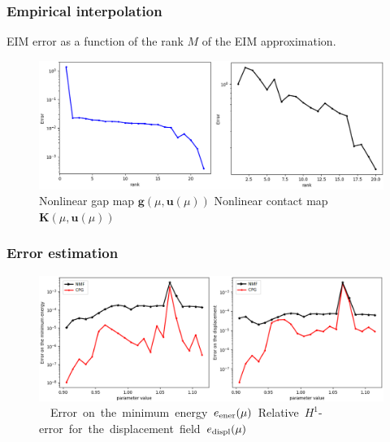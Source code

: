 \begin{frame}\frametitle{Empirical interpolation}
	EIM error as a function of the rank $M$ of the EIM approximation.
	\medskip
	
	\begin{figure}[ht!]
		\includegraphics[width=\textwidth]{./images/contact/eims.png}
		\centering 
		\tiny{Nonlinear gap map $\mathbf g(\mu,\mathbf u(\mu))$
			Nonlinear contact map $\mathbf K(\mu,\mathbf u(\mu))$}
	\end{figure}
\end{frame}

\begin{frame}\frametitle{Error estimation}
	\hspace{-1.05cm}
	\begin{minipage}{\textwidth}
		\begin{figure}[ht!]
			\includegraphics[width=1.17\textwidth]{./images/contact/ener_displ.png}
			\centering 
			\mbox{
				\tiny{\newline{} Error on the minimum energy $e_{\rm ener}(\mu)$
					\hspace{1.8cm} Relative $H^1$-error for the displacement field $e_{\rm displ}(\mu)$}
			}
			\label{fig:a_rb_err}
		\end{figure}
	\end{minipage}
\end{frame}



